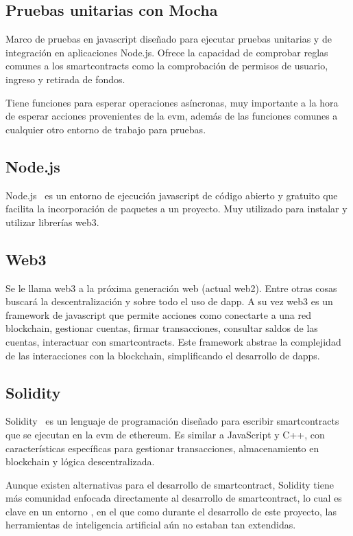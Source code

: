 \subsection{Pruebas unitarias con Mocha}
\label{sec:mochasection}
Marco de pruebas en \gls{javascript} diseñado para ejecutar pruebas unitarias y 
de integración en aplicaciones Node.js. 
Ofrece la capacidad de comprobar reglas comunes a los \glspl{smartcontract} como 
la comprobación de permisos de usuario, ingreso y retirada de fondos.

Tiene funciones para esperar operaciones asíncronas, muy importante a la hora de 
esperar acciones provenientes de la \gls{evm}, además de las funciones comunes
a cualquier otro entorno de trabajo para pruebas.

\subsection{Node.js}

Node.js~\cite{[17]} es un entorno de ejecución \gls{javascript}  de código abierto y 
gratuito que facilita la incorporación de paquetes a un proyecto. Muy utilizado 
para instalar y utilizar librerías  \gls{web3}.

\subsection{Web3}

Se le llama web3 a la próxima generación web (actual web2).
Entre otras cosas buscará la descentralización y sobre todo el uso de \gls{dapp}.
A su vez web3 es un \gls{framework} de \gls{javascript} que permite acciones como 
conectarte a una red blockchain, gestionar cuentas, firmar transacciones,
consultar saldos de las cuentas, interactuar con \glspl{smartcontract}.
Este framework abstrae la complejidad de las interacciones con la \gls{blockchain}, 
simplificando el desarrollo de \glspl{dapp}.


\subsection{Solidity}

Solidity~\cite{[15]} es un lenguaje de programación diseñado para escribir 
\glspl{smartcontract} que se ejecutan en la \gls{evm} de \gls{ethereum}.
Es similar a JavaScript y C++, con características específicas para gestionar 
transacciones, almacenamiento en blockchain y lógica descentralizada. 

Aunque existen alternativas para el desarrollo de \gls{smartcontract}, Solidity
tiene más comunidad enfocada directamente al desarrollo de \gls{smartcontract}, lo cual
es clave en un entorno , en el que como durante el desarrollo de este proyecto,
 las herramientas de inteligencia artificial aún no estaban tan extendidas.

